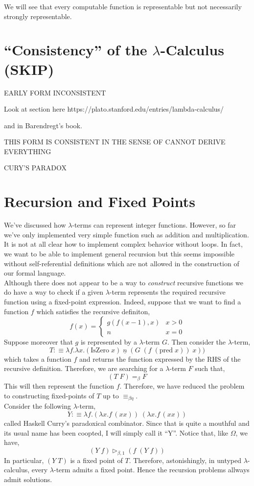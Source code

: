 \documentclass[12pt]{article}
\newcommand{\red}{\triangleright}
\newcommand{\bredo}{\red_{\beta,1}}
\begin{document}
\begin{rmk}
We will see that every computable function is representable but not necessarily strongly representable. 
\end{rmk}

\section{``Consistency'' of the $\lambda$-Calculus (SKIP)}

EARLY FORM INCONSISTENT

Look at section here https://plato.stanford.edu/entries/lambda-calculus/

and in Barendregt's book. 

THIS FORM IS CONSISTENT IN THE SENSE OF CANNOT DERIVE EVERYTHING

CURY'S PARADOX

\section{Recursion and Fixed Points}

We've discussed how $\lambda$-terms can represent integer functions. However, so far we've only implemented very simple function such as addition and multiplication. It is not at all clear how to implement complex behavior without loops. In fact, we want to be able to implement general recursion but this seems impossible without self-referential definitions which are not allowed in the construction of our formal language. 
\bigskip\\
Although there does not appear to be a way to \textit{construct} recursive functions we do have a way to check if a given $\lambda$-term represents the required recursive function using a fixed-point expression. Indeed, suppose that we want to find a function $f$ which satisfies the recursive definiton,
\[ f(x) = 
\begin{cases}
g(f(x-1), x) & x > 0
\\
n & x = 0
\end{cases}\]
Suppose moreover that $g$ is represented by a $\lambda$-term $G$. Then consider the $\lambda$-term,
\[ T :\equiv \lambda f . \lambda x . (\text{IsZero} \; x) \; \underline{n} \; (G \; (f \; (\text{pred} \; x)) \; x)) \]
which takes a function $f$ and returns the function expressed by the RHS of the recursive definition. Therefore, we are searching for a $\lambda$-term $F$ such that,
\[ (T \; F) =_\beta F \]
This will then represent the function $f$. Therefore, we have reduced the problem to constructing fixed-points of $T$ up to $\equiv_{\beta\eta}$.  
\bigskip\\
Consider the following $\lambda$-term,
\[ Y :\equiv \lambda f. (\lambda x. f \, (x x)) \; (\lambda x. f \, (x x)) \]
called Haskell Curry's paradoxical combinator. Since that is quite a mouthful and its usual name has been coopted, I will simply call it ``Y''. 
Notice that, like $\Omega$, we have,
\[ (Y \; f) \bredo (f \; (Y \; f)) \]
In particular, $(Y \; T)$ is a fixed point of $T$. Therefore, astonishingly, in untyped $\lambda$-calculus, every $\lambda$-term admits a fixed point. Hence the recursion problems allways admit solutions. 
\end{document}
